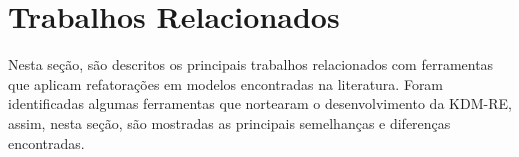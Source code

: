 


\section{Trabalhos Relacionados}\label{sec:trabalhos_relacionados_ferramentas_kdm_re}

Nesta seção, são descritos os principais trabalhos relacionados com ferramentas que aplicam refatorações em modelos encontradas na literatura. Foram identificadas algumas ferramentas que nortearam o desenvolvimento da KDM-RE, assim, nesta seção, são mostradas as principais semelhanças e diferenças encontradas.

